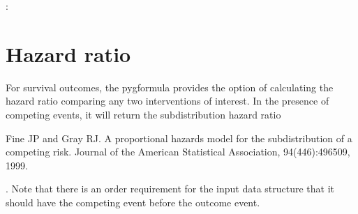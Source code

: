 \documentclass[letterpaper,10pt,english]{sphinxmanual}
\begin{document}
\begin{sphinxVerbatim}[commandchars=\\\{\}]
  
  
  

            
\end{sphinxVerbatim}

\sphinxAtStartPar
{}:
\begin{quote}

\end{quote}


\section{Hazard ratio}
\label{\detokenize{Specifications/Hazard ratio:hazard-ratio}}\label{\detokenize{Specifications/Hazard ratio:id1}}\label{\detokenize{Specifications/Hazard ratio::doc}}
\sphinxAtStartPar
For survival outcomes, the pygformula provides the option of calculating the hazard ratio comparing any
two interventions of interest. In the presence of competing events, it will return the subdistribution hazard ratio
\sphinxstepexplicit %
\begin{footnote}[1]\label{\thesphinxscope.1}%
\sphinxAtStartFootnote
Fine JP and Gray RJ. A proportional hazards model for the subdistribution of a competing risk. Journal of the American Statistical Association, 94(446):496\textendash{}509, 1999.
%
\end{footnote}. Note that there is an order requirement for the input data structure that it should have the competing event before the outcome event.
\end{document}
